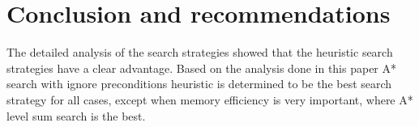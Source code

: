 \documentclass[11pt]{article}
\begin{document}
\section{Conclusion and recommendations}

The detailed analysis of the search strategies showed that the heuristic search strategies have a clear advantage. Based on the analysis done in this paper A* search with ignore preconditions heuristic is determined to be the best search strategy for all cases, except when memory efficiency is very important, where A* level sum search is the best.
\end{document}
